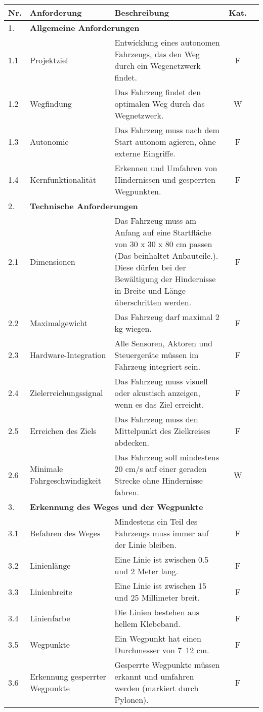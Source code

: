 \documentclass[../main.tex]{subfiles}
\begin{document}
\begin{longtable}[]{@{}lp{4.5cm}p{7.5cm}cc}
  \textbf{Nr.}
& \textbf{Anforderung}
& \textbf{Beschreibung}
& \textbf{Kat.}

\tabularnewline
\hline
\endhead
  1.  & \multicolumn{4}{l}{\textbf{Allgemeine Anforderungen}} \\ \hline
  1.1 & Projektziel & Entwicklung eines autonomen Fahrzeugs, das den Weg durch ein Wegenetzwerk findet. & F\\ \hline
  1.2 & Wegfindung & Das Fahrzeug findet den optimalen Weg durch das Wegnetzwerk. & W \\ \hline
  1.3 & Autonomie & Das Fahrzeug muss nach dem Start autonom agieren, ohne externe Eingriffe. & F  \\ \hline
  1.4 & Kernfunktionalität & Erkennen und Umfahren von Hindernissen und gesperrten Wegpunkten. & F  \\ \hline
  
  2.  & \multicolumn{4}{l}{\textbf{Technische Anforderungen}} \\ \hline
  \hypertarget{A2.1}{2.1} & Dimensionen & Das Fahrzeug muss am Anfang auf eine Startfläche von 30 x 30 x 80 cm passen (Das beinhaltet Anbauteile.). Diese dürfen bei der Bewältigung der Hindernisse in Breite und Länge überschritten werden. & F \\ \hline
  2.2 & Maximalgewicht & Das Fahrzeug darf maximal 2 kg wiegen. & F  \\ \hline
  \hypertarget{A2.3}{2.3} & Hardware-Integration & Alle Sensoren, Aktoren und Steuergeräte müssen im Fahrzeug integriert sein. & F\\ \hline
  \hypertarget{A2.4}{2.4} & Zielerreichungssignal & Das Fahrzeug muss visuell oder akustisch anzeigen, wenn es das Ziel erreicht. & F \\ \hline
  \hypertarget{A2.5}{2.5} & Erreichen des Ziels & Das Fahrzeug muss den Mittelpunkt des Zielkreises abdecken. & F \\ \hline
  \hypertarget{A2.6}{2.6} & Minimale Fahrgeschwindigkeit & Das Fahrzeug soll mindestens 20 cm/s auf einer geraden Strecke ohne Hindernisse fahren. & W \\ \hline
 
  3.  & \multicolumn{4}{l}{\textbf{Erkennung des Weges und der Wegpunkte}} \\ \hline
  \hypertarget{A3.1}{3.1} & Befahren des Weges & Mindestens ein Teil des Fahrzeugs muss immer auf der Linie bleiben. & F \\ \hline
  3.2 & Linienlänge & Eine Linie ist zwischen 0.5 und 2 Meter lang. & F \\ \hline
  3.3 & Linienbreite & Eine Linie ist zwischen 15 und 25 Millimeter breit. & F \\ \hline
  3.4 & Linienfarbe & Die Linien bestehen aus hellem Klebeband. & F \\ \hline
  3.5 & Wegpunkte & Ein Wegpunkt hat einen Durchmesser von 7–12 cm. & F \\ \hline
  \hypertarget{A3.6}{3.6} & Erkennung gesperrter Wegpunkte & Gesperrte Wegpunkte müssen erkannt und umfahren werden (markiert durch Pylonen). & F \\ \hline


\end{longtable}
\end{document}
